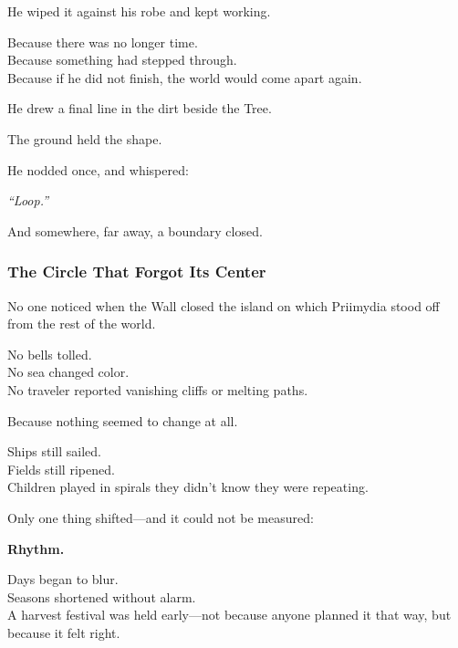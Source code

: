 \documentclass[12pt]{article}
\begin{document}
\vspace{0.5em}
He wiped it against his robe and kept working.

\vspace{0.5em}
Because there was no longer time.\\
Because something had stepped through.\\
Because if he did not finish, the world would come apart again.

\vspace{0.5em}
He drew a final line in the dirt beside the Tree.

\vspace{0.5em}
The ground held the shape.

\vspace{0.5em}
He nodded once, and whispered:

\vspace{0.5em}
\textit{``Loop.''}

\vspace{0.5em}
And somewhere, far away, a boundary closed.

\dotfill

\subsubsection*{The Circle That Forgot Its Center}

No one noticed when the Wall closed the island on which Priimydia stood off from the rest of the world.

\vspace{0.5em}
No bells tolled.\\
No sea changed color.\\
No traveler reported vanishing cliffs or melting paths.

\vspace{0.5em}
Because nothing seemed to change at all.

\vspace{0.5em}
Ships still sailed.\\
Fields still ripened.\\
Children played in spirals they didn’t know they were repeating.

\vspace{0.5em}
Only one thing shifted---and it could not be measured:

\vspace{0.5em}
\textbf{Rhythm.}

\vspace{0.5em}
Days began to blur.\\
Seasons shortened without alarm.\\
A harvest festival was held early---not because anyone planned it that way, but because it felt right.
\end{document}
